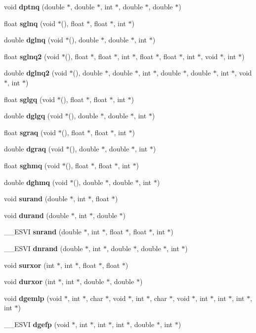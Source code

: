 \begin{CompactItemize}
\item 
void {\bf dptnq} (double $\ast$, double $\ast$, int $\ast$, double $\ast$, double $\ast$)
\item 
float {\bf sglnq} (void $\ast$(), float $\ast$, float $\ast$, int $\ast$)
\item 
double {\bf dglnq} (void $\ast$(), double $\ast$, double $\ast$, int $\ast$)
\item 
float {\bf sglnq2} (void $\ast$(), float $\ast$, float $\ast$, int $\ast$, float $\ast$, float $\ast$, int $\ast$, void $\ast$, int $\ast$)
\item 
double {\bf dglnq2} (void $\ast$(), double $\ast$, double $\ast$, int $\ast$, double $\ast$, double $\ast$, int $\ast$, void $\ast$, int $\ast$)
\item 
float {\bf sglgq} (void $\ast$(), float $\ast$, float $\ast$, int $\ast$)
\item 
double {\bf dglgq} (void $\ast$(), double $\ast$, double $\ast$, int $\ast$)
\item 
float {\bf sgraq} (void $\ast$(), float $\ast$, float $\ast$, int $\ast$)
\item 
double {\bf dgraq} (void $\ast$(), double $\ast$, double $\ast$, int $\ast$)
\item 
float {\bf sghmq} (void $\ast$(), float $\ast$, float $\ast$, int $\ast$)
\item 
double {\bf dghmq} (void $\ast$(), double $\ast$, double $\ast$, int $\ast$)
\item 
void {\bf surand} (double $\ast$, int $\ast$, float $\ast$)
\item 
void {\bf durand} (double $\ast$, int $\ast$, double $\ast$)
\item 
\_\-\_\-ESVI {\bf snrand} (double $\ast$, int $\ast$, float $\ast$, float $\ast$, int $\ast$)
\item 
\_\-\_\-ESVI {\bf dnrand} (double $\ast$, int $\ast$, double $\ast$, double $\ast$, int $\ast$)
\item 
void {\bf surxor} (int $\ast$, int $\ast$, float $\ast$, float $\ast$)
\item 
void {\bf durxor} (int $\ast$, int $\ast$, double $\ast$, double $\ast$)
\item 
void {\bf dgemlp} (void $\ast$, int $\ast$, char $\ast$, void $\ast$, int $\ast$, char $\ast$, void $\ast$, int $\ast$, int $\ast$, int $\ast$, int $\ast$)
\item 
\_\-\_\-ESVI {\bf dgefp} (void $\ast$, int $\ast$, int $\ast$, int $\ast$, double $\ast$, int $\ast$)
\item 

\end{CompactItemize}
